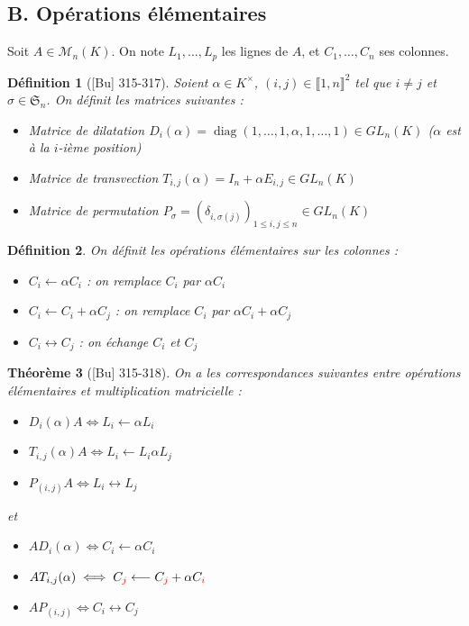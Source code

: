 \documentclass[10pt, a4paper, parskip=full, twoside, twocolumn]{report}
\newtheorem{definition}{Définition}
\newtheorem{theorem}[definition]{Théorème}
\newcommand{\M}{\mathcal{M}}
\DeclareMathOperator{\diag}{diag}
\begin{document}
\subsection*{B. Opérations élémentaires}
Soit $A\in\M_n(K)$. On note $L_1, \dots, L_p$ les lignes de $A$, et $C_1,\dots,C_n$ ses colonnes.
\begin{definition}[\textnormal{[Bu] 315-317}]
	Soient $\alpha \in K^{\times}$, $(i,j)\in\llbracket 1,n\rrbracket^2$ tel que $i\neq j$ et $\sigma\in\mathfrak{S}_n$. On définit les matrices suivantes :
	\begin{itemize}
		\item Matrice de \emph{dilatation} $D_i(\alpha) = \diag(1,\dots, 1, \alpha,1,\dots, 1)\in GL_n(K)$ ($\alpha$ est à la $i$-ième position)
		\item Matrice de \emph{transvection} $T_{i,j}(\alpha) = I_n + \alpha E_{i,j}\in GL_n(K)$
		\item Matrice de \emph{permutation} $P_{\sigma} = \left(\delta_{i,\sigma(j)}\right)_{1\leq i,j\leq n}\in GL_n(K)$
	\end{itemize}
\end{definition}

\begin{definition}
	On définit les \emph{opérations élémentaires} sur les colonnes :
	\begin{itemize}
		\item $C_i \longleftarrow \alpha C_i$ : on remplace $C_i$ par $\alpha C_i$
		\item $C_i \longleftarrow C_i + \alpha C_j$ : on remplace $C_i$ par $\alpha C_i+\alpha C_j$
		\item $C_i \longleftrightarrow C_j$ : on échange $C_i$ et $C_j$
	\end{itemize}
\end{definition}

\begin{theorem}[\textnormal{[Bu] 315-318}]
	On a les correspondances suivantes entre opérations élémentaires et multiplication matricielle :
	\begin{itemize}
		\item $D_i(\alpha)A\iff L_i \longleftarrow \alpha L_i$
		\item $T_{i,j}(\alpha)A\iff L_i \longleftarrow L_i \alpha L_j$
		\item $P_{(i,j)}A\iff L_i \longleftrightarrow L_j$
	\end{itemize}
	et 
	\begin{itemize}
		\item $A D_i(\alpha)\iff C_i \longleftarrow \alpha C_i$
		\item $AT_{i,j}(\alpha)\iff C_{\textcolor{red}{j}} \longleftarrow C_{\textcolor{red}{j}} + \alpha C_{\textcolor{red}{i}}$		
		\item $AP_{(i,j)}\iff C_i \longleftrightarrow C_j$
	\end{itemize}
\end{theorem}
\end{document}
